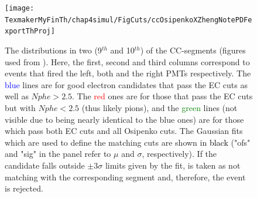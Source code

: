 \begin{figure}[H] %
\centering
\leavevmode \texttt{[image: TexmakerMyFinTh/chap4simul/FigCuts/ccOsipenkoXZhengNotePDFexportThProj]}  %
\caption[CC-projected \th distributions]{The \thp distributions %
in two (9$^{th}$ and 10$^{th}$) of the CC-segments (figures used from \cite{anaNoteXZheng}). Here, the first, second and third columns correspond to events that fired the left, both and the right PMTs respectively. The \textcolor{blue}{blue} lines are for good electron candidates that pass the EC cuts as well as $Nphe > 2.5$. The \textcolor{red}{red} ones are for those that pass the EC cuts but with $Nphe < 2.5$ (thus likely pions), and the \textcolor{green}{green} lines (not visible due to being nearly identical to the blue ones) are for those which pass both EC cuts and all Osipenko cuts. The Gaussian fits which are used to define the \th matching cuts are shown in \textcolor{black}{black} ("ofs" and "sig" in the panel refer to $\mu$ and $\sigma$, respectively). If the candidate falls outside $\pm 3 \sigma$ limits given by the fit, \thp is taken as not matching with the corresponding segment and, therefore, the event is rejected.}
\label{ccThProjDist}
\end{figure}
    


